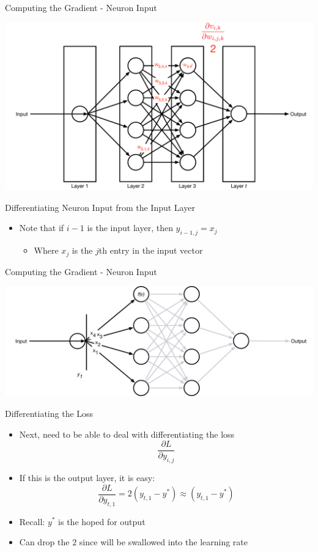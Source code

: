 \documentclass[aspectratio=169]{beamer}
\begin{document}
\begin{frame}{Computing the Gradient - Neuron Input}

\includegraphics[width=1\textwidth]{lectBP/nnbpStep2.pdf}
\end{frame}
\begin{frame}{Differentiating Neuron Input from the Input Layer}

\begin{itemize} 
	\item Note that if $i-1$ is the input layer, then $y_{i-1,j} = x_j$
		\begin{itemize}
		\item Where $x_j$ is the $j$th entry in the input vector
		\end{itemize}
\end{itemize}
\end{frame}
\begin{frame}{Computing the Gradient - Neuron Input}

\includegraphics[width=1\textwidth]{lectBP/nnbpInput.pdf}
\end{frame}
\begin{frame}{Differentiating the Loss}

\begin{itemize}
	\item Next, need to be able to deal with differentiating the loss
		$$\frac{\partial L}{\partial y_{i,j}}$$
	\item If this is the output layer, it is easy:
	$$\frac{\partial L}{\partial y_{t,1}} = 2 (y_{t,1} - y^{*}) \approx (y_{t,1} - y^{*})$$
	\item Recall: $y^*$ is the hoped for output
	\item Can drop the $2$ since will be swallowed into the learning rate
\end{itemize}
\end{frame}
\end{document}
